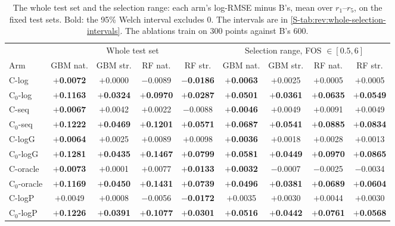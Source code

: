 \begin{table}[htbp]
\centering
\footnotesize
\setlength{\tabcolsep}{2.5pt}
\caption{The whole test set and the selection range: each arm's log-RMSE minus B's, mean over $r_1$--$r_5$, on the fixed test sets. Bold: the 95\% Welch interval excludes 0. The intervals are in \cref{S-tab:rev:whole-selection-intervals}. The ablations train on 300 points against B's 600.}
\label{tab:rev:whole-selection}
\begin{tabular}{lcccc|cccc}
\toprule
 & \multicolumn{4}{c|}{Whole test set} & \multicolumn{4}{c}{Selection range, FOS $\in [0.5, 6]$} \\
\cmidrule(lr){2-5} \cmidrule(lr){6-9}
Arm & GBM nat. & GBM str. & RF nat. & RF str. & GBM nat. & GBM str. & RF nat. & RF str. \\
\midrule
C-log & \textbf{$+$0.0072} & $+$0.0000 & $-$0.0089 & \textbf{$-$0.0186} & \textbf{$+$0.0063} & $+$0.0025 & $+$0.0005 & $+$0.0005 \\
C$_0$-log & \textbf{$+$0.1163} & \textbf{$+$0.0324} & \textbf{$+$0.0970} & \textbf{$+$0.0287} & \textbf{$+$0.0501} & \textbf{$+$0.0361} & \textbf{$+$0.0635} & \textbf{$+$0.0549} \\
C-seq & \textbf{$+$0.0067} & $+$0.0042 & $+$0.0022 & $-$0.0088 & \textbf{$+$0.0046} & $+$0.0049 & $+$0.0091 & $+$0.0049 \\
C$_0$-seq & \textbf{$+$0.1222} & \textbf{$+$0.0469} & \textbf{$+$0.1201} & \textbf{$+$0.0571} & \textbf{$+$0.0687} & \textbf{$+$0.0541} & \textbf{$+$0.0885} & \textbf{$+$0.0834} \\
C-logG & \textbf{$+$0.0064} & $+$0.0025 & $+$0.0089 & $+$0.0098 & \textbf{$+$0.0036} & $+$0.0018 & $+$0.0028 & $+$0.0013 \\
C$_0$-logG & \textbf{$+$0.1281} & \textbf{$+$0.0435} & \textbf{$+$0.1467} & \textbf{$+$0.0799} & \textbf{$+$0.0581} & \textbf{$+$0.0449} & \textbf{$+$0.0970} & \textbf{$+$0.0865} \\
C-oracle & \textbf{$+$0.0073} & $+$0.0001 & $+$0.0077 & \textbf{$+$0.0133} & \textbf{$+$0.0032} & $-$0.0007 & $-$0.0025 & $-$0.0034 \\
C$_0$-oracle & \textbf{$+$0.1169} & \textbf{$+$0.0450} & \textbf{$+$0.1431} & \textbf{$+$0.0739} & \textbf{$+$0.0496} & \textbf{$+$0.0381} & \textbf{$+$0.0689} & \textbf{$+$0.0604} \\
C-logP & $+$0.0049 & $+$0.0008 & $-$0.0056 & \textbf{$-$0.0172} & $+$0.0035 & $+$0.0030 & $+$0.0044 & $+$0.0030 \\
C$_0$-logP & \textbf{$+$0.1226} & \textbf{$+$0.0391} & \textbf{$+$0.1077} & \textbf{$+$0.0301} & \textbf{$+$0.0516} & \textbf{$+$0.0442} & \textbf{$+$0.0761} & \textbf{$+$0.0568} \\

\end{tabular}
\end{table}
